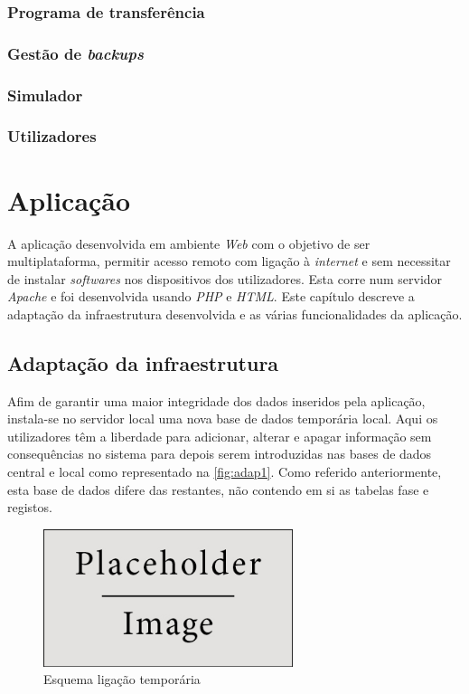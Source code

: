 \documentclass[11pt,twoside,a4paper]{report}
\begin{document}
\subsection{Programa de transferência}

\subsection{Gestão de \textit{backups}}

\subsection{Simulador}

\subsection{Utilizadores}

\cleardoublepage
\chapter{Aplicação}
A aplicação desenvolvida em ambiente  \textit{Web} com o objetivo de ser multiplataforma, permitir acesso remoto com ligação à \textit{internet} e sem necessitar de instalar \textit{softwares} nos dispositivos dos utilizadores. Esta corre num servidor \textit{Apache} e foi desenvolvida usando \textit{PHP} e \textit{HTML}. Este capítulo descreve a adaptação da infraestrutura desenvolvida e as várias funcionalidades da aplicação.

\section{Adaptação da infraestrutura}
Afim de garantir uma maior integridade dos dados inseridos pela aplicação, instala-se no servidor local uma nova base de dados temporária local. Aqui os utilizadores têm a liberdade para adicionar, alterar e apagar informação sem consequências no sistema para depois serem introduzidas nas bases de dados central e local como representado na \autoref{fig:adap1}. Como referido anteriormente, esta base de dados difere das restantes, não contendo em si as tabelas fase e registos.
\begin{figure}[H]
	\begin{center}
		\includegraphics[width=0.65\textwidth]{placeholder} %
		\caption{Esquema ligação temporária}
		\label{fig:adap1}
	\end{center}
\end{figure}
\end{document}
